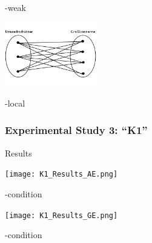 \documentclass[fleqn,10pt,serif,xcolor=dvipsnames]{beamer}
\begin{document}
\begin{frame}
\begin{minipage}[t]{0.35\linewidth}
\begin{flushright}
      \vspace{-0.7cm}
      \begin{center}
        -weak
      \end{center}
      \includegraphics[width=4cm]{./../../pictures/Umweltschuetzer06.PNG}
      \vspace{-0.7cm}
      \begin{center}
        -local
      \end{center}
    \end{flushright}
  \end{minipage}
\end{frame}


\begin{frame}
  \frametitle{Experimental Study 3: ``K1''}
  \begin{block}{Results}
    \begin{minipage}[t]{0.45\linewidth}
      \vspace{0cm}
      \texttt{[image: K1\_Results\_AE.png]}
      \vspace{-0.6cm}
      \begin{center}
        -condition
      \end{center}
    \end{minipage}
    \hspace{0.3cm}
    \begin{minipage}[t]{0.45\linewidth}
      \vspace{0cm}
      \texttt{[image: K1\_Results\_GE.png]}
      \vspace{-0.6cm}
      \begin{center}
        -condition
      \end{center}
    \end{minipage}
  \end{block}
\end{frame}
\end{document}
